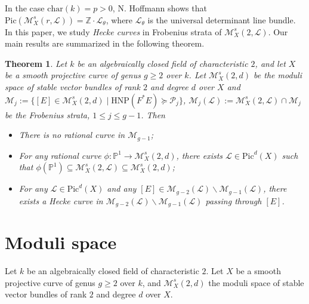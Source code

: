 \documentclass{kms-b}
\numberwithin{equation}{section}
\theoremstyle{plain}
\newtheorem{theorem}{Theorem}[section]
\theoremstyle{definition}
\theoremstyle{remark}
\begin{document}
In the case $\mathrm{char}(k)=p>0$, N. Hoffmann \cite{Hoffmann12} shows that $\mathrm{Pic}(\mathcal{M}^s_X(r,\mathcal{L})) = \mathbb{Z}\cdot \mathcal{L}_{\theta}$, where $\mathcal{L}_{\theta}$ is the universal determinant line bundle. In this paper, we study \emph{Hecke curves} in Frobenius strata of $\mathcal{M}^s_X(2,\mathcal{L})$. Our main results are summarized in the following theorem.
\begin{theorem}
Let $k$ be an algebraically closed field of characteristic $2$, and let $X$ be a smooth projective curve of genus $g\geqslant 2$ over $k$. Let $\mathcal{M}^s_X(2,d)$ be the moduli space of stable vector bundles of rank $2$ and degree $d$ over $X$ and $\mathcal{M}_j:= \{ [E]\in \mathcal{M}_X^s(2,d) \mid \mathrm{HNP}(F^*E) \succcurlyeq \mathscr{P}_j \}$, $\mathcal{M}_j(\mathcal{L}):=\mathcal{M}^s_X(2,\mathcal{L}) \cap \mathcal{M}_j$ be the Frobenius strata,  $1\leqslant j \leqslant g-1$. Then
\begin{itemize}
    \item [(1)] There is no rational curve in $\mathcal{M}_{g-1}$;
    \item[(2)] For any rational curve $\phi: \mathbb{P}^1 \to \mathcal{M}^s_X(2,d)$, there exists $\mathcal{L} \in \mathrm{Pic}^d(X)$ such that $\phi(\mathbb{P}^1) \subseteq \mathcal{M}^s_X(2,\mathcal{L}) \subseteq \mathcal{M}^s_X(2,d)$;
    \item[(3)] For any $\mathcal{L}\in \mathrm{Pic}^d(X)$ and any $[E] \in \mathcal{M}_{g-2}(\mathcal{L}) \backslash \mathcal{M}_{g-1}(\mathcal{L})$, there exists a Hecke curve in $\mathcal{M}_{g-2}(\mathcal{L})\backslash \mathcal{M}_{g-1}(\mathcal{L})$ passing through $[E]$.
\end{itemize}
\end{theorem}

\section{Moduli space}\label{sec2}
Let $k$ be an algebraically closed field of characteristic $2$. Let $X$ be a smooth projective curve of genus $g\geqslant 2$ over $k$, and 
$\mathcal{M}^{s}_X(2,d)$ the moduli space of stable vector bundles of rank $2$ and degree $d$ over $X$.
\end{document}
